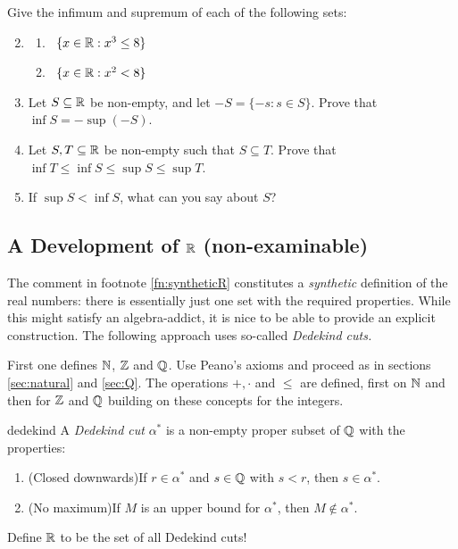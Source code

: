 \begin{exercises}{}{}
	\exstart %
	Give the infimum and supremum of each of the following sets:
	\begin{enumerate}\setcounter{enumi}{1}
	  \item[]\begin{enumerate}
	    \item {} \ $\{x\in\mathbb{R}:x^3\le 8\}$
	    \setcounter{enumii}{2}
	    \item {} \ $\{x\in\mathbb{R}:x^2<8\}$
	  \end{enumerate}
	  
	
	  \item%
	  Let $S\subseteq\mathbb{R}$ be non-empty, and let $-S=\{-s:s\in S\}$. Prove that $\inf S=-\sup(-S)$.
	
	
	  \item%
	  Let $S,T\subseteq\mathbb{R}$ be non-empty such that $S\subseteq T$. Prove that $\inf T\le \inf S\le \sup S\le\sup T$.
	  
	  \item If $\sup S<\inf S$, what can you say about $S$?
	  
	\end{enumerate}
\end{exercises}


\clearpage


\subsection[A Development of R]{A Development of $\mathbb{R}$ (non-examinable)}\label{sec:dedekind}

The comment in footnote \ref{fn:syntheticR} constitutes a \emph{synthetic} definition of the real numbers: there is essentially just one set with the required properties. While this might satisfy an algebra-addict, it is nice to be able to provide an explicit construction. The following approach uses so-called \emph{Dedekind cuts.}\medbreak

First one defines $\mathbb{N}$, $\mathbb{Z}$ and $\mathbb{Q}$. Use Peano's axioms and proceed as in sections \ref{sec:natural} and \ref{sec:Q}. The operations $+,\cdot$ and $\le$ are defined, first on $\mathbb{N}$ and then for $\mathbb{Z}$ and $\mathbb{Q}$ building on these concepts for the integers.

\begin{defn}{}{dedekind}
	A \emph{Dedekind cut} $\alpha^*$ is a non-empty proper subset of $\mathbb{Q}$ with the properties:
	\begin{enumerate}
  	\item (Closed downwards)\lstsp If $r\in\alpha^*$ and $s\in\mathbb{Q}$ with $s<r$, then $s\in\alpha^*$.
  	\item (No maximum)\lstsp If $M$ is an upper bound for $\alpha^*$, then $M\not\in\alpha^*$.
	\end{enumerate}
	Define $\mathbb{R}$ to be the set of all Dedekind cuts!
\end{defn}

